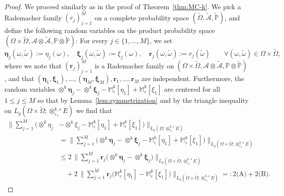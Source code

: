 \documentclass[reqno]{amsart}
\numberwithin{equation}{section}
\newcommand{\bbM}{\mathbb{M}}
\newcommand{\bbP}{\mathbb{P}}
\newcommand{\cA}{\mathcal{A}}
\newcommand{\Omegat}{\widetilde{\Omega}}
\newcommand{\omegat}{\widetilde{\omega}}
\newcommand{\cAt}{\widetilde{\cA}}
\newcommand{\bbPt}{\widetilde{\bbP}}
\newcommand{\rvec}{\boldsymbol{r}}
\newcommand{\etavec}{\boldsymbol{\eta}}
\newcommand{\xivec}{\boldsymbol{\xi}}
\newcommand{\xk}{\otimes^k}
\newcommand{\xkseps}{\otimes^{k,s}_{\varepsilon_s}}
\newcommand{\Mk}{\bbM^k_\varepsilon}
\theoremstyle{remark}
\theoremstyle{definition}
\begin{document}
\begin{proof} 
	We proceed similarly as in 
	the proof of Theorem~\ref{thm:MC-k}.  
	We pick 
	a Rademacher family $(r_j)_{j=1}^M$ 
	on a complete probability space 
	$(\Omegat,\cAt,\bbPt)$,  
	and define 
	the following random variables on 
	the product probability space 
	$(\Omega \times \Omegat,\cA \otimes \cAt,\bbP\otimes\bbPt)$: 
	For every $j\in\{1,\ldots,M\}$,  we set  
	\[
	\etavec_j(\omega,\omegat) := \eta_j(\omega), 
	\quad 
	\xivec_j(\omega,\omegat) := \xi_j(\omega), 
	\quad 
	\rvec_j(\omega,\omegat) := r_j(\omegat) 
	\qquad 
	\forall (\omega,\omegat) \in \Omega\times\Omegat, 
	\]
	where we note that 
	$(\rvec_j)_{j=1}^M$ is a Rademacher family 
	on $(\Omega \times \Omegat,\cA \otimes \cAt,\bbP\otimes\bbPt)$, 
	and that 
	$(\etavec_1,\xivec_1), \ldots,(\etavec_M,\xivec_M), \rvec_1,\ldots,\rvec_M$ 
	are independent. 
	Furthermore,  
	the random variables 
	$\xk \etavec_j  - \xk \xivec_j  -  \Mk[\eta_1] + \Mk[\xi_1]$ 
	are centered for all $1\leq j \leq M$ 
	so that by Lemma~\ref{lem:symmetrization} 
	and by the triangle inequality on 
	$L_q(\Omega\times\widetilde{\Omega};\xkseps E)$ 
	we find that 
	\begin{equation}\label{eq:proof:prop:MLMC-k}  
	\begin{split} 
	\biggl\| 
	\sum_{j=1}^M 
	\bigl(\xk \eta_j &- \xk \xi_j - \Mk [\eta_1] + \Mk[\xi_1] \bigr)
	\biggr\|_{L_q(\Omega;\xkseps E)} 
	\\  
	&= 
	\biggl\| 
	\sum_{j=1}^M 
	\bigl( \xk \etavec_j - \xk \xivec_j - \Mk[\eta_1] + \Mk[\xi_1] \bigr)
	\biggr\|_{L_q(\Omega\times\widetilde{\Omega};\xkseps E)} 
	\\
	&\leq 
	2\, 
	\biggl\| 
	\sum_{j=1}^M 
	\rvec_j 
	\bigl( \xk \etavec_j  - \xk \xivec_j  \bigr) 
	\biggr\|_{L_q(\Omega\times\widetilde{\Omega};\xkseps E)}   
	\\
	&\quad + 
	2\, 
	\biggl\| 
	\sum_{j=1}^M 
	\rvec_j 
	\bigl( \Mk[\eta_1] - \Mk[\xi_1] \bigr)
	\biggr\|_{L_q(\Omega\times\widetilde{\Omega};\xkseps E)}   
	=: 
	2\text{(A)} + 2\text{(B)}. 
	\end{split} 
	\end{equation}
	

\end{proof}
\end{document}
